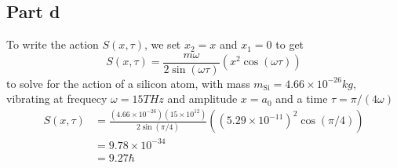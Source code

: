 \documentclass[12pt]{report}
\begin{document}
\subsection*{Part d}
To write the action $S(x,\tau)$, we set $x_2 = x$ and $x_1 = 0$ to get 
\begin{equation*}
  S(x,\tau) = \frac{m\omega}{2\sin(\omega \tau)}( x^2\cos(\omega \tau))
\end{equation*}
to solve for the action of a silicon atom, with mass $m_{\text{Si}} = 4.66 \times 10^{-26} \si{kg}$, vibrating at frequecy $\omega = 15\si{THz}$ and amplitude $x = a_0$ and a time $\tau = \pi/(4\omega)$
\begin{align*}
    S(x,\tau) &= \frac{(4.66 \times 10^{-26})(15\times 10^{12})}{2\sin(\pi/4)} ((5.29 \times 10^{-11})^2 \cos(\pi/4)) \\
    &= 9.78 \times 10^{-34} \\
    &= 9.27 \hbar
\end{align*}
\end{document}
